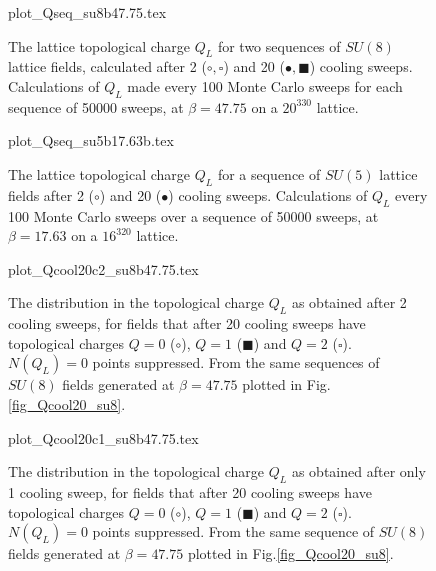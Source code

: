 \documentclass[12pt]{article}
\begin{document}
\begin{figure}[htb]
\begin	{center}
\leavevmode
	{plot_Qseq_su8b47.75.tex}
\end	{center}
\caption{The lattice topological charge $Q_L$ for two sequences of $SU(8)$ lattice fields,
  calculated after 2 ($\circ,\square$) and 20 ($\bullet,\blacksquare$) cooling sweeps.
  Calculations of $Q_L$ made every 100 Monte Carlo sweeps for each sequence of 50000 sweeps,
  at $\beta=47.75$ on a $20^330$ lattice.}
\label{fig_Qseq_su8}
\end{figure}


\begin{figure}[htb]
\begin	{center}
\leavevmode
	{plot_Qseq_su5b17.63b.tex}
\end	{center}
\caption{The lattice topological charge $Q_L$ for a sequence of $SU(5)$ lattice fields after
2 ($\circ$) and 20 ($\bullet$) cooling sweeps. Calculations of $Q_L$ every 100 Monte Carlo sweeps
over a sequence of 50000 sweeps, at $\beta=17.63$ on a $16^320$ lattice.}
\label{fig_Qseq_su5}
\end{figure}



\begin{figure}[htb]
\begin	{center}
\leavevmode
	{plot_Qcool20c2_su8b47.75.tex}
\end	{center}
\caption{The distribution in the topological charge $Q_L$ as obtained after 2 cooling sweeps,
for fields that after 20 cooling sweeps have topological charges $Q=0$ ($\circ$),
$Q=1$ ($\blacksquare$) and $Q=2$ ($\square$). $N(Q_L)=0$ points suppressed. 
From the same sequences of $SU(8)$ fields generated 
at $\beta=47.75$ plotted in Fig.\ref{fig_Qcool20_su8}.} 
\label{fig_Qcool20c2_su8}
\end{figure}



\begin{figure}[htb]
\begin	{center}
\leavevmode
	{plot_Qcool20c1_su8b47.75.tex}
\end	{center}
\caption{The distribution in the topological charge $Q_L$ as obtained after only 1 cooling sweep,
for fields that after 20 cooling sweeps have topological charges $Q=0$ ($\circ$),
$Q=1$ ($\blacksquare$) and $Q=2$ ($\square$).  $N(Q_L)=0$ points suppressed. 
From the same sequence of $SU(8)$ fields generated 
at $\beta=47.75$ plotted in Fig.\ref{fig_Qcool20_su8}.} 
\label{fig_Qcool20c1_su8}
\end{figure}
\end{document}
